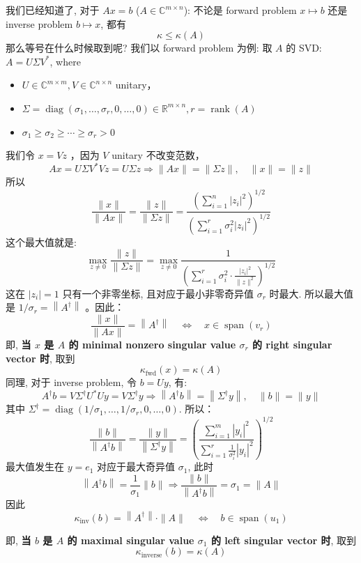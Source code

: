 \begin{remark}
    我们已经知道了, 对于 $Ax = b$ ($A\in \mathbb{C}^{m\times n}$): 不论是 forward problem  $x\mapsto b$ 还是 inverse problem $b \mapsto x$, 都有\[
    \kappa \leq \kappa(A)
    \]
那么等号在什么时候取到呢?    我们以 forward problem 为例: 取 $A$ 的 SVD: $A=U \Sigma V^*$, where 
    \begin{itemize}
        \item $U \in \mathbb{C}^{m \times m}, V \in \mathbb{C}^{n \times n}$ unitary，
        \item $\Sigma=\operatorname{diag}\left(\sigma_1, \ldots, \sigma_r, 0, \ldots, 0\right) \in \mathbb{R}^{m \times n}, r=\operatorname{rank}(A)$ 
        \item  $\sigma_1 \geq \sigma_2 \geq \cdots \geq \sigma_r>0$
    \end{itemize}
我们令 $x=V z$ ，因为 $V$ unitary 不改变范数，
$$
A x=U \Sigma V^* V z=U \Sigma z \Rightarrow\|A x\|=\|\Sigma z\|, \quad\|x\|=\|z\|
$$
所以 $$
\frac{\|x\|}{\|A x\|}=\frac{\|z\|}{\|\Sigma z\|}=\frac{\left(\sum_{i=1}^n\left|z_i\right|^2\right)^{1 / 2}}{\left(\sum_{i=1}^r \sigma_i^2\left|z_i\right|^2\right)^{1 / 2}}
$$
这个最大值就是: $$
\max _{z \neq 0} \frac{\|z\|}{\|\Sigma z\|}=\max _{z \neq 0} \frac{1}{\left(\sum_{i=1}^r \sigma_i^2 \cdot \frac{\left|z_i\right|^2}{\|z\|^2}\right)^{1 / 2}}
$$
这在 $\left|z_i\right|=1$ 只有一个非零坐标, 且对应于最小非零奇异值 $\sigma_r$ 时最大. 所以最大值是 $1 / \sigma_r=\left\|A^{\dagger}\right\|$ 。因此：
$$
\frac{\|x\|}{\|A x\|}=\left\|A^{\dagger}\right\| \quad \Longleftrightarrow \quad x \in \operatorname{span}\left(v_r\right)
$$ 即, \textbf{当 $x$ 是 $A$ 的 minimal nonzero singular value  $\sigma_r$ 的 right singular vector 时}, 取到 \[
\kappa_{\mathrm{fwd}}(x) = \kappa(A)
\]
同理, 对于 inverse problem, 令 $b=U y$, 有:
$$
A^{\dagger} b=V \Sigma^{\dagger} U^* U y=V \Sigma^{\dagger} y \Rightarrow\left\|A^{\dagger} b\right\|=\left\|\Sigma^{\dagger} y\right\|, \quad\|b\|=\|y\|
$$
其中 $\Sigma^{\dagger}=\operatorname{diag}\left(1 / \sigma_1, \ldots, 1 / \sigma_r, 0, \ldots, 0\right)$. 所以： $$
\frac{\|b\|}{\left\|A^{\dagger} b\right\|}=\frac{\|y\|}{\left\|\Sigma^{\dagger} y\right\|}=\left(\frac{\sum_{i=1}^m\left|y_i\right|^2}{\sum_{i=1}^r \frac{1}{\sigma_i^2}\left|y_i\right|^2}\right)^{1 / 2}
$$最大值发生在 $y=e_1$ 对应于最大奇异值 $\sigma_1$, 此时
$$
\left\|A^{\dagger} b\right\|=\frac{1}{\sigma_1}\|b\| \Rightarrow \frac{\|b\|}{\left\|A^{\dagger} b\right\|}=\sigma_1=\|A\|
$$
因此
$$
\kappa_{\mathrm{inv}}(b)=\left\|A^{\dagger}\right\| \cdot\|A\| \quad \Longleftrightarrow \quad b \in \operatorname{span}\left(u_1\right)
$$

 即, \textbf{当 $b$ 是 $A$ 的 maximal singular value  $\sigma_1$ 的 left singular vector 时}, 取到 \[
\kappa_{\mathrm{inverse}}(b) = \kappa(A)
\]
\end{remark}
